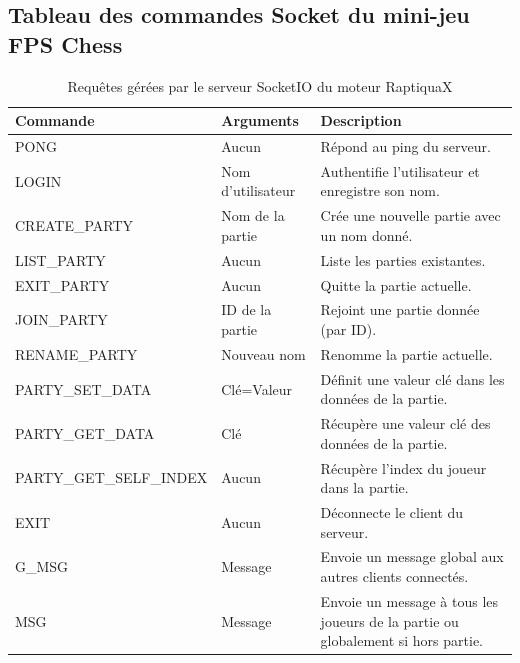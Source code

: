 \subsection{Tableau des commandes Socket du mini-jeu \og FPS Chess \fg{}}
    \begin{table}[H]
        \centering
        \scriptsize
        \renewcommand{\arraystretch}{1.1}
        \begin{tabular}{|l|p{2.5cm}|p{4.5cm}|}
            \hline
            \textbf{Commande} & \textbf{Arguments} & \textbf{Description} \\
            \hline
            PONG & Aucun & Répond au ping du serveur. \\
            LOGIN & Nom d'utilisateur & Authentifie l'utilisateur et enregistre son nom. \\
            CREATE\_PARTY & Nom de la partie & Crée une nouvelle partie avec un nom donné. \\
            LIST\_PARTY & Aucun & Liste les parties existantes. \\
            EXIT\_PARTY & Aucun & Quitte la partie actuelle. \\
            JOIN\_PARTY & ID de la partie & Rejoint une partie donnée (par ID). \\
            RENAME\_PARTY & Nouveau nom & Renomme la partie actuelle. \\
            PARTY\_SET\_DATA & Clé=Valeur & Définit une valeur clé dans les données de la partie. \\
            PARTY\_GET\_DATA & Clé & Récupère une valeur clé des données de la partie. \\
            PARTY\_GET\_SELF\_INDEX & Aucun & Récupère l'index du joueur dans la partie. \\
            EXIT & Aucun & Déconnecte le client du serveur. \\
            G\_MSG & Message & Envoie un message global aux autres clients connectés. \\
            MSG & Message & Envoie un message à tous les joueurs de la partie ou globalement si hors partie. \\
            \hline
        \end{tabular}
        \caption{Requêtes gérées par le serveur SocketIO du moteur RaptiquaX}
        \label{tab:raptiquax_requests}
    \end{table}